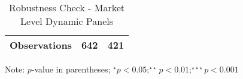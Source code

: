 \begin{table}[H]
\begin{threeparttable}[t]
\begin{tabular}{@{}lcc@{}}
Observations             & 642            & 421            \\ \bottomrule
\end{tabular}%
\begin{tablenotes}
\item Note: $p$-value in parentheses; $^\star p<0.05;^{\star\star} p<0.01;^{\star\star\star} p<0.001$
\end{tablenotes}
\end{threeparttable}
\vspace{10pt}
\caption{Robustness Check - Market Level Dynamic Panels}
\label{rob_mkt_dynamic}
\end{table} 
